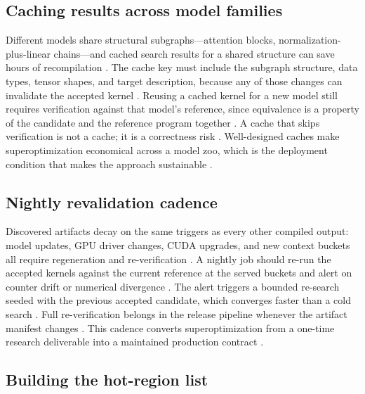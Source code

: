 \subsection{Caching results across model families}

Different models share structural subgraphs---attention blocks, normalization-plus-linear chains---and cached search results for a shared structure can save hours of recompilation \citep{wu2024mirage,dao2022flashattention}. The cache key must include the subgraph structure, data types, tensor shapes, and target description, because any of those changes can invalidate the accepted kernel \citep{wu2024mirage,patel2025llminference}. Reusing a cached kernel for a new model still requires verification against that model's reference, since equivalence is a property of the candidate and the reference program together \citep{wu2024mirage,chen2020compilerbasedhardw}. A cache that skips verification is not a cache; it is a correctness risk \citep{wu2024mirage,taxbreak2026}. Well-designed caches make superoptimization economical across a model zoo, which is the deployment condition that makes the approach sustainable \citep{patel2025llminference,memoryfloor2026}.

\subsection{Nightly revalidation cadence}

Discovered artifacts decay on the same triggers as every other compiled output: model updates, GPU driver changes, CUDA upgrades, and new context buckets all require regeneration and re-verification \citep{wu2024mirage,memoryfloor2026,patel2025llminference}. A nightly job should re-run the accepted kernels against the current reference at the served buckets and alert on counter drift or numerical divergence \citep{wu2024mirage,taxbreak2026}. The alert triggers a bounded re-search seeded with the previous accepted candidate, which converges faster than a cold search \citep{wu2024mirage,chen2020compilerbasedhardw}. Full re-verification belongs in the release pipeline whenever the artifact manifest changes \citep{wu2024mirage,memoryfloor2026}. This cadence converts superoptimization from a one-time research deliverable into a maintained production contract \citep{patel2025llminference,wu2024mirage}.

\subsection{Building the hot-region list}

